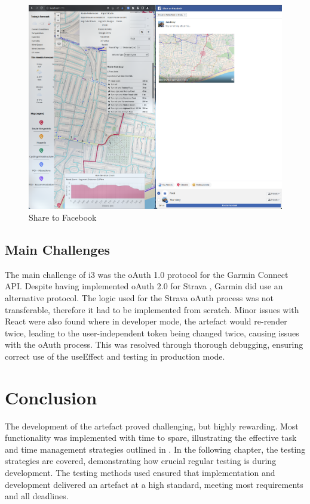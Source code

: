 \begin{figure}[!ht]
  \includegraphics[width=425px]{figures/Progress Images/Iteration-3/SR51/SR51-Share to Facebook.png}
  \centering
  \caption{Share to Facebook}
  \label{fig:facebook-share}
\end{figure}

\subsection{Main Challenges}
\label{iteration3:main-challenges}

The main challenge of i3 was the oAuth 1.0 protocol for the Garmin Connect API. Despite having implemented oAuth 2.0 for Strava , Garmin did use an alternative protocol. The logic used for the Strava oAuth process was not transferable, therefore it had to be implemented from scratch. Minor issues with React were also found where in developer mode, the artefact would re-render twice, leading to the user-independent token being changed twice, causing issues with the oAuth process. This was resolved through thorough debugging, ensuring correct use of the useEffect and testing in production mode.

\section{Conclusion}
\label{implementation:conclusion}

The development of the artefact proved challenging, but highly rewarding. Most functionality was implemented with time to spare, illustrating the effective task and time management strategies outlined in . In the following chapter, the testing strategies are covered, demonstrating how crucial regular testing is during development. The testing methods used ensured that implementation and development delivered an artefact at a high standard, meeting most requirements and all deadlines.